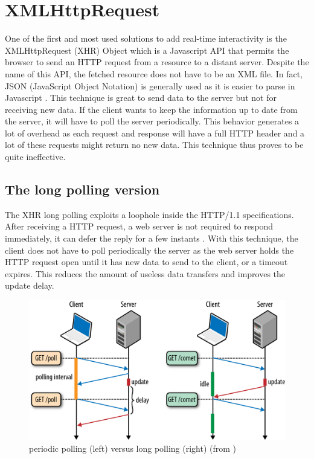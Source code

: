 \documentclass[journal,compsoc]{IEEEtran}
\begin{document}
\section{XMLHttpRequest}
\label{XHR}
One of the first and most used solutions to add real-time interactivity is the XMLHttpRequest (XHR) Object which is a Javascript API that permits the browser to send an HTTP request from a resource to a distant server.
Despite the name of this API, the fetched resource does not have to be an XML file.
In fact, JSON (JavaScript Object Notation) is generally used as it is easier to parse in Javascript \cite{collinalatency}.
This technique is great to send data to the server but not for receiving new data.
If the client wants to keep the information up to date from the server, it will have to poll the server periodically.
This behavior generates a lot of overhead as each request and response will have a full HTTP header and a lot of these requests might return no new data. This technique thus proves to be quite ineffective.

\subsection{The long polling version}

The XHR long polling exploits a loophole inside the \mbox{HTTP/1.1} specifications.
After receiving a HTTP request, a web server is not required to respond immediately, it can defer the reply for a few instants \cite{collinalatency}.
With this technique, the client does not have to poll periodically the server as the web server holds the HTTP request open until it has new data to send to the client, or a timeout expires.
This reduces the amount of useless data transfers and improves the update delay.

\begin{figure}[!ht]
  \centering
  \includegraphics[width=\linewidth]{poll_vs_lpoll}
  \caption{periodic polling (left) versus long polling (right) (from \cite{HighPerfBrowserNetworking:polling})}
  \label{poll_vs_lpoll}
\end{figure}
\end{document}

